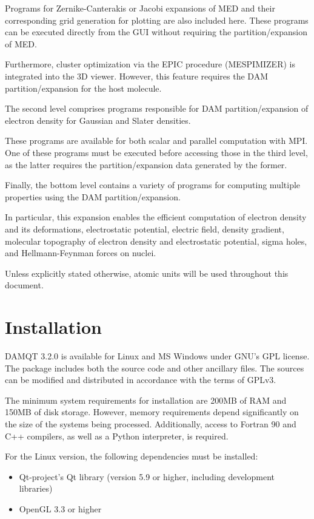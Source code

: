 \documentclass[10pt]{article}
\begin{document}
Programs for Zernike-Canterakis or Jacobi expansions of MED and their corresponding grid generation for plotting are also included here.
These programs can be executed directly from the GUI without requiring the partition/expansion of MED.

Furthermore, cluster optimization via the EPIC procedure (MESPIMIZER) is integrated into the 3D viewer. However, this feature requires the DAM partition/expansion for the host molecule. 

The second level comprises programs responsible for DAM partition/expansion of electron density for Gaussian and Slater densities.

These programs are available for both scalar and parallel computation with MPI.
One of these programs must be executed before accessing those in the third level, as the latter requires the partition/expansion data generated by the former. 

Finally, the bottom level contains a variety of programs for computing multiple properties using the DAM partition/expansion. 

In particular, this expansion enables the efficient computation of electron density and its deformations, electrostatic potential, electric field, density gradient,
molecular topography of electron density and electrostatic potential, sigma holes, and Hellmann-Feynman forces on nuclei.

Unless explicitly stated otherwise, atomic units will be used throughout this document.

\newpage

\section{Installation \label{sec:1}}

DAMQT 3.2.0 is available for Linux and MS Windows under GNU's GPL license.
The package includes both the source code and other ancillary files.
The sources can be modified and distributed in accordance with the terms of GPLv3.

The minimum system requirements for installation are 200MB of RAM and 150MB of disk storage.
However, memory requirements depend significantly on the size of the systems being processed.
Additionally, access to Fortran 90 and C++ compilers, as well as a Python interpreter, is required.

For the Linux version, the following dependencies must be installed:
\begin{itemize}
\item Qt-project's Qt library (version 5.9 or higher, including development libraries)
\item OpenGL 3.3 or higher
\end{itemize}
\end{document}
